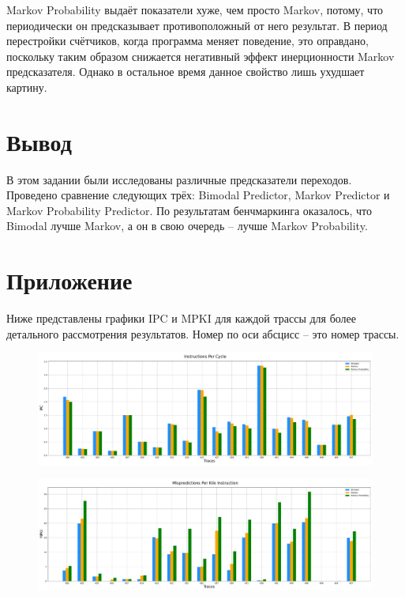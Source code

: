 	Markov Probability выдаёт показатели хуже, чем просто Markov, потому, что периодически он предсказывает противоположный от него результат. В период перестройки счётчиков, когда программа меняет поведение, это оправдано, поскольку таким образом снижается негативный эффект инерционности Markov предсказателя. Однако в остальное время данное свойство лишь ухудшает картину.
	
	\newpage
	
	\section*{Вывод}
	В этом задании были исследованы различные предсказатели переходов. Проведено сравнение следующих трёх: Bimodal Predictor, Markov Predictor и Markov Probability Predictor. По результатам бенчмаркинга оказалось, что Bimodal лучше Markov, а он в свою очередь -- лучше Markov Probability.

	\newpage
	\section*{Приложение}
	Ниже представлены графики IPC и MPKI для каждой трассы для более детального рассмотрения результатов. Номер по оси абсцисс -- это номер трассы.

	\newpage
	\thispagestyle{empty}
	\begin{landscape}
		\vspace*{\fill}
		\begin{figure}[h!]
			\centering
			\includegraphics[width=\linewidth]{./pictures/ipc_traces.pdf}
		\end{figure}
		\vspace*{\fill}
	\end{landscape}

	\newpage
	\newgeometry{left=0.1cm,right=0.1cm,top=0cm,bottom=0cm}
	\thispagestyle{empty}
	\begin{landscape}
		\vspace*{\fill}
		\begin{figure}[h!]
			\centering
			\includegraphics[width=\linewidth]{./pictures/mpki_traces.pdf}
		\end{figure}
		\vspace*{\fill}
	\end{landscape}

